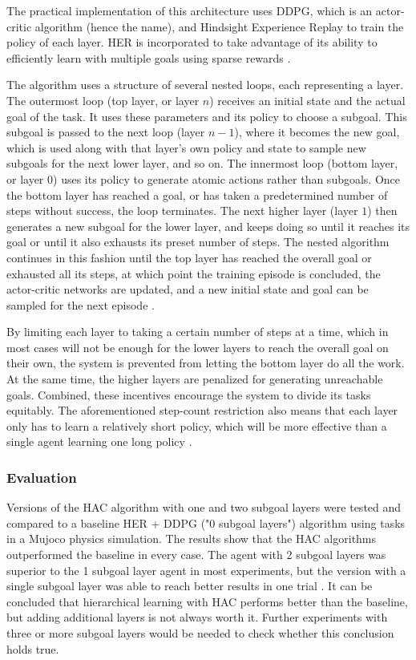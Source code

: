 \documentclass[runningheads]{llncs}
\begin{document}
The practical implementation of this architecture uses DDPG, which is an actor-critic algorithm (hence the name), and Hindsight Experience Replay to train the policy of each layer. HER is incorporated to take advantage of its ability to efficiently learn with multiple goals using sparse rewards \cite{levy2017hierarchical}.

The algorithm uses a structure of several nested loops, each representing a layer. The outermost loop (top layer, or layer $n$) receives an initial state and the actual goal of the task. It uses these parameters and its policy to choose a subgoal. This subgoal is passed to the next loop (layer $n-1$), where it becomes the new goal, which is used along with that layer's own policy and state to sample new subgoals for the next lower layer, and so on. The innermost loop (bottom layer, or layer $0$) uses its policy to generate atomic actions rather than subgoals. Once the bottom layer has reached a goal, or has taken a predetermined number of steps without success, the loop terminates. The next higher layer (layer $1$) then generates a new subgoal for the lower layer, and keeps doing so until it reaches its goal or until it also exhausts its preset number of steps. The nested algorithm continues in this fashion until the top layer has reached the overall goal or exhausted all its steps, at which point the training episode is concluded, the actor-critic networks are updated, and a new initial state and goal can be sampled for the next episode \cite{levy2017hierarchical}.

By limiting each layer to taking a certain number of steps at a time, which in most cases will not be enough for the lower layers to reach the overall goal on their own, the system is prevented from letting the bottom layer do all the work. At the same time, the higher layers are penalized for generating unreachable goals. Combined, these incentives encourage the system to divide its tasks equitably. The aforementioned step-count restriction also means that each layer only has to learn a relatively short policy, which will be more effective than a single agent learning one long policy \cite{levy2017hierarchical}.

\subsubsection{Evaluation}

Versions of the HAC algorithm with one and two subgoal layers were tested and compared to a baseline HER + DDPG ("0 subgoal layers") algorithm using tasks in a Mujoco physics simulation. The results show that the HAC algorithms outperformed the baseline in every case. The agent with 2 subgoal layers was superior to the 1 subgoal layer agent in most experiments, but the version with a single subgoal layer was able to reach better results in one trial  \cite{levy2017hierarchical}. It can be concluded that hierarchical learning with HAC performs better than the baseline, but adding additional layers is not always worth it. Further experiments with three or more subgoal layers would be needed to check whether this conclusion holds true.
\end{document}
